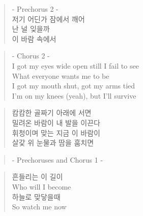 \begin{verse}
- Prechorus 2 -\\
저기 어딘가 잠에서 깨어\\
난 널 잊을까\\
이 바람 속에서
\end{verse}

\clearpage
\bckg

\begin{verse}
- Chorus 2 -\\
I got my eyes wide open still I fail to see\\
What everyone wants me to be\\
I got my mouth shut, got my arms tied\\
I'm on my knees (yeah), but I'll survive
\end{verse}

\begin{verse}
캄캄한 골짜기 아래에 서면\\
밀려온 바람이 내 발을 이끈다\\
휘청이며 맞는 지금 이 바람이\\
살갗 위 눈물과 땀을 훔치면
\end{verse}

\begin{verse}
- Prechoruses and Chorus 1 -
\end{verse}

\begin{verse}
흔들리는 이 길이\\
Who will I become\\
하늘로 맞닿을때\\
So watch me now
\end{verse}


\clearpage
